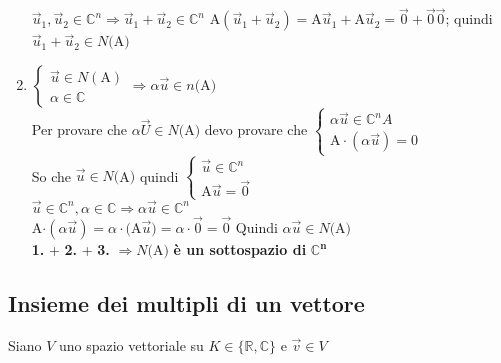\begin{enumerate}
        \footnotesize{
            $\vec{u}_1, \vec{u}_2\in\mathbb{C}^n 
            \Longrightarrow
            \vec{u}_1+\vec{u}_2\in\mathbb{C}^n$ 
            A$(\vec{u}_1+\vec{u}_2)=$A$\vec{u}_1+$A$\vec{u}_2=
            \vec{0}+\vec{0}\vec{0}$; 
            quindi $\vec{u}_1+\vec{u}_2\in N($A$)$
        }
    \item $
            \begin{cases}
                \vec{u}\in N(\textrm{A})\\
                \alpha \in \mathbb{C}
            \end{cases}
            \Longrightarrow
            \alpha\vec{u}\in n($A$)
            $\\
            Per provare che $\alpha\vec{U}\in N($A$)$ devo provare che $ 
            \begin{cases}
                \alpha\vec{u}\in\mathbb{C}^nA\\
                \textrm{A} \cdot (\alpha\vec{u})=0
            \end{cases}
            $\\
            So che $\vec{u}\in N($A$)$ quindi $ 
            \begin{cases}
                \vec{u}\in\mathbb{C}^n\\
                \textrm{A}\vec{u}=\vec{0}
            \end{cases}
            $\\
            $\vec{u}\in\mathbb{C}^n, \alpha\in\mathbb{C}\Longrightarrow 
            \alpha\vec{u}\in\mathbb{C}^n
            $\\
            A$\cdot (\alpha\vec{u})=\alpha\cdot($A$\vec{u})=\alpha\cdot\vec{0}
            =\vec{0}$ 
            Quindi $\alpha\vec{u}\in N($A$)$\\
            \textbf{1.} + \textbf{2.} + \textbf{3.} $\Longrightarrow N($A$)$ 
            \textbf{è un sottospazio di }$\pmb{\mathbb{C}^n}$ 
\end{enumerate}

\subsection{Insieme dei multipli di un vettore}
Siano $V$ uno spazio vettoriale su $K\in\{\mathbb{R},\mathbb{C}\}$ e 
$\vec{v}\in V$

